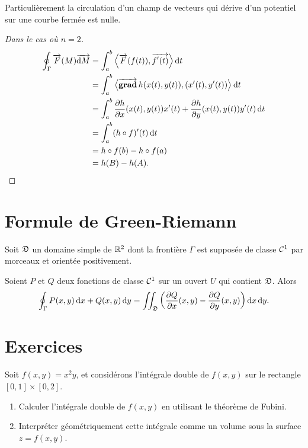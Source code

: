   Particulièrement la circulation d'un champ de vecteurs qui dérive d'un 
  potentiel sur une courbe fermée est nulle.

  \begin{proof}[Dans le cas où \(n=2\)]
    \begin{align}
      \oint_\Gamma \overrightarrow{F}(M)\overrightarrow{\mathop{}\mathopen{}\mathrm{d} M}  &= \int_a^b 
      \left\langle{\overrightarrow{F}(f(t))},{\overrightarrow{f'(t)}}\right\rangle \mathop{}\mathopen{}\mathrm{d} t \\
      &= \int_a^b \left\langle{\operatorname{\overrightarrow{\mathbf{grad}}}h(x(t), y(t))},{(x'(t), y'(t))}\right\rangle \mathop{}\mathopen{}\mathrm{d} t  \\
      &= \int_a^b \dfrac{\partial{} h}{\partial{} x}(x(t), y(t))x'(t) + \dfrac{\partial{} h}{\partial{} y}(x(t), 
      y(t))y'(t) \mathop{}\mathopen{}\mathrm{d} t \\
      &=\int_a^b (h \circ f)'(t)\mathop{}\mathopen{}\mathrm{d} t \\
      &=h\circ f(b)-h\circ f(a) \\
      &=h(B)-h(A).
    \end{align}
  \end{proof}

  \section{Formule de Green-Riemann}

  \begin{theo}[Admis]
    Soit \(\mathfrak{D}\) un domaine simple de \(\mathbb{R}^2\) dont la frontière 
    \(\Gamma\) est supposée de classe \(\mathcal{C}^{1}\) par morceaux et orientée 
    positivement.

    Soient \(P\) et \(Q\) deux fonctions de classe \(\mathcal{C}^{1}\) sur un ouvert 
    \(U\) qui contient \(\mathfrak{D}\). Alors
    \begin{equation}
      \oint_\Gamma P(x,y) \mathop{}\mathopen{}\mathrm{d} x +Q(x,y)\mathop{}\mathopen{}\mathrm{d} y = \iint_{\mathfrak{D}} 
      \left(\dfrac{\partial{} Q}{\partial{} x}(x,y) - \dfrac{\partial{} Q}{\partial{} y}(x,y)\right)\mathop{}\mathopen{}\mathrm{d} x \mathop{}\mathopen{}\mathrm{d} y.
    \end{equation}
  \end{theo}
\section{Exercices}
\begin{exercice}
Soit \( f(x, y) = x^2 y \), et considérons l'intégrale double de \( f(x, y) \) sur le rectangle \( [0, 1] \times [0, 2] \).
\begin{enumerate}
    \item Calculer l'intégrale double de \( f(x, y) \) en utilisant le théorème de Fubini.
    \item Interpréter géométriquement cette intégrale comme un volume sous la surface \( z = f(x, y) \).
\end{enumerate}
\end{exercice}

